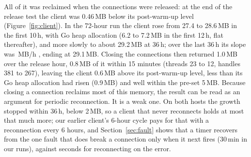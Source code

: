 \documentclass[letterpaper,twocolumn,10pt]{article}
\begin{document}
All of it was reclaimed when the connections were released: at the end of the release test the client was 0.46\,MB below its post-warm-up level (Figure~\ref{fig:client}).
In the 72-hour run the client rose from 27.4 to 28.6\,MB in the first 10\,h, with Go heap allocation (6.2 to 7.2\,MB in the first 12\,h, flat thereafter), and more slowly to about 29.2\,MB at 36\,h; over the last 36\,h its slope was \LPrivLate{}\,MB/h \LPrivLateCI{}, ending at 29.1\,MB.
Closing the connections then returned 1.0\,MB over the release hour, 0.8\,MB of it within 15 minutes (threads 23 to 12, handles 381 to 267), leaving the client 0.6\,MB above its post-warm-up level, less than its Go heap allocation had risen (0.9\,MB) and well within the pre-set 5\,MB.
Because closing a connection reclaims most of this memory, the result can be read as an argument for periodic reconnection.
It is a weak one.
On both hosts the growth stopped within 36\,h, below 2\,MB, so a client that never reconnects holds at most that much more; our earlier client's 6-hour cycle pays for that with a reconnection every 6 hours, and Section~\ref{sec:fault} shows that a timer recovers from the one fault that does break a connection only when it next fires (30\,min in our runs), against seconds for reconnecting on the error.
\end{document}
